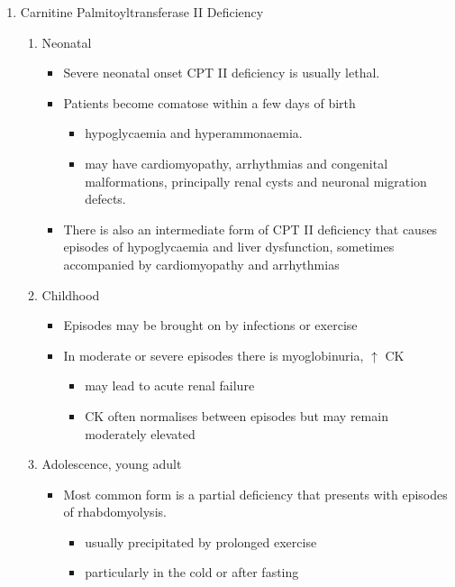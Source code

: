 \documentclass{scrartcl}
\begin{document}
\begin{enumerate}
\item Carnitine Palmitoyltransferase II Deficiency
\label{sec:orgbf4c311}
\begin{enumerate}
\item Neonatal
\label{sec:org6804786}
\begin{itemize}
\item Severe neonatal onset CPT II deficiency is usually lethal.
\item Patients become comatose within a few days of birth
\begin{itemize}
\item hypoglycaemia and hyperammonaemia.
\item may have cardiomyopathy, arrhythmias and congenital malformations,
principally renal cysts and neuronal migration defects.
\end{itemize}
\item There is also an intermediate form of CPT II deficiency that causes
episodes of hypoglycaemia and liver dysfunction, sometimes
accompanied by cardiomyopathy and arrhythmias
\end{itemize}

\item Childhood
\label{sec:orga4eef9d}
\begin{itemize}
\item Episodes may be brought on by infections or exercise
\item In moderate or severe episodes there is myoglobinuria, \(\uparrow\) CK
\begin{itemize}
\item may lead to acute renal failure
\item CK often normalises between episodes but may remain moderately
elevated
\end{itemize}
\end{itemize}

\item Adolescence,  young adult
\label{sec:org9fb9d76}
\begin{itemize}
\item Most common form is a partial deficiency that presents with
episodes of rhabdomyolysis.
\begin{itemize}
\item usually precipitated by prolonged exercise
\item particularly in the cold or after fasting
\end{itemize}
\end{itemize}
\end{enumerate}
\end{enumerate}
\end{document}
